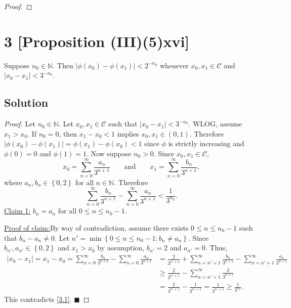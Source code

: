 \documentclass[12pt]{article}
\newenvironment{claimproof}[1]{\par\noindent\underline{Proof of claim:}\space#1}{\hfill $\blacksquare$\vspace{5mm}}
\begin{document}
\begin{proof}
\vspace{-5mm}
\end{proof}

\newpage 
\section*{3 [Proposition (III)(5)xvi]}
Suppose $n_{0} \in \mathbb{N}$. Then $|\phi(x_{0}) - \phi(x_{1})| < 2^{-n_{0}}$ whenever $x_{0}, x_{1} \in \mathcal{C}$ and $|x_{0} - x_{1}| < 3^{-n_{0}}$.

\subsection*{Solution}
\begin{proof}
Let $n_{0} \in \mathbb{N}$. Let $x_{0}, x_{1} \in \mathcal{C}$ such that $|x_{0} - x_{1}| < 3^{-n_{0}}$. WLOG, assume $x_{1} > x_{0}$. If $n_{0} = 0$, then $x_{1} - x_{0} < 1$
implies $x_{0}, x_{1} \in (0,1)$. Therefore $|\phi(x_{0}) - \phi(x_{1})| = \phi(x_{1}) - \phi(x_{0}) < 1$ since $\phi$ is strictly increasing and
$\phi(0) = 0$ and $\phi(1) = 1$. Now suppose $n_{0} > 0$. Since $x_{0}, x_{1} \in \mathcal{C}$, 
\[ x_{0} = \sum_{n=0}^{\infty}\frac{a_{n}}{3^{n+1}} \qquad \text{and} \qquad x_{1} = \sum_{n=0}^{\infty}\frac{b_{n}}{3^{n+1}}, \]
where $a_{n}, b_{n} \in \left\{ 0,2 \right\}$ for all $n \in \mathbb{N}$. Therefore 
\begin{equation}
\sum_{n=0}^{\infty}\frac{b_{n}}{3^{n+1}} - \sum_{n=0}^{\infty}\frac{a_{n}}{3^{n+1}} < \frac{1}{3^{n_{0}}}.
\label{3.1}
\end{equation}
\underline{Claim 1:} $b_{n} = a_{n}$ for all $0 \leq n \leq n_{0} - 1$.
\begin{claimproof}
By way of contradiction, assume there exists $0 \leq n\leq n_{0}-1$ such that $b_{n} - a_{n} \neq 0$. Let $n' = \min\left\{ 0 \leq n \leq n_0 -1 :
b_{n} \neq a_{n} \right\}$. Since $b_{n'}, a_{n'} \in \left\{ 0,2 \right\}$ and $x_{1} > x_{0}$ by assumption, $b_{n'} = 2$ and $a_{n'} = 0$. Thus,
\begin{align*}
|x_{0} - x_{1}| = x_{1} - x_{0} = \sum_{n=0}^{\infty}\frac{b_{n}}{3^{n+1}} - \sum_{n=0}^{\infty}\frac{a_{n}}{3^{n+1}} 
& = \frac{2}{3^{n'+1}} + \sum_{n=n'+1}^{\infty}\frac{b_{n}}{3^{n+1}} - \sum_{n=n'+1}^{\infty}\frac{a_{n}}{3^{n+1}} \\
& \geq \frac{2}{3^{n'+1}} - \sum_{n=n'+1}^{\infty}\frac{2}{3^{n+1}} \\
& = \frac{2}{3^{n'+1}} - \frac{1}{3^{n'+1}} = \frac{1}{3^{n'+1}} \geq \frac{1}{3^{n_{0}}}.
\end{align*}
This contradicts \eqref{3.1}.
\end{claimproof}


\end{proof}
\end{document}

